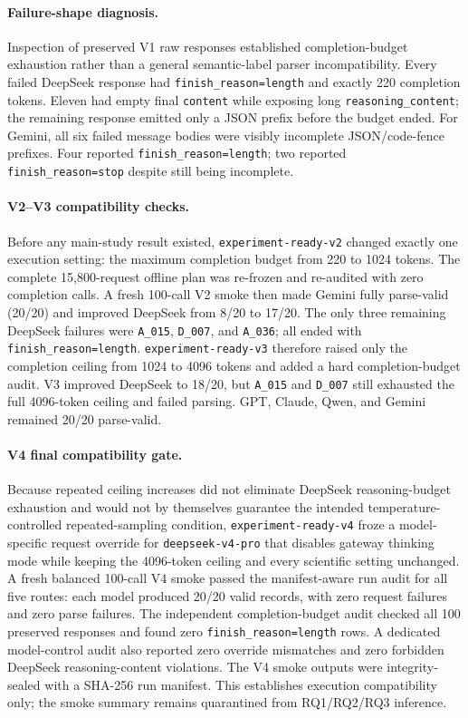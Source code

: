 \paragraph{Failure-shape diagnosis.}
Inspection of preserved V1 raw responses established completion-budget exhaustion rather than a general semantic-label parser incompatibility. Every failed DeepSeek response had \texttt{finish\_reason=length} and exactly 220 completion tokens. Eleven had empty final \texttt{content} while exposing long \texttt{reasoning\_content}; the remaining response emitted only a JSON prefix before the budget ended. For Gemini, all six failed message bodies were visibly incomplete JSON/code-fence prefixes. Four reported \texttt{finish\_reason=length}; two reported \texttt{finish\_reason=stop} despite still being incomplete.

\paragraph{V2--V3 compatibility checks.}
Before any main-study result existed, \texttt{experiment-ready-v2} changed exactly one execution setting: the maximum completion budget from 220 to 1024 tokens. The complete 15,800-request offline plan was re-frozen and re-audited with zero completion calls. A fresh 100-call V2 smoke then made Gemini fully parse-valid (20/20) and improved DeepSeek from 8/20 to 17/20. The only three remaining DeepSeek failures were \texttt{A\_015}, \texttt{D\_007}, and \texttt{A\_036}; all ended with \texttt{finish\_reason=length}. \texttt{experiment-ready-v3} therefore raised only the completion ceiling from 1024 to 4096 tokens and added a hard completion-budget audit. V3 improved DeepSeek to 18/20, but \texttt{A\_015} and \texttt{D\_007} still exhausted the full 4096-token ceiling and failed parsing. GPT, Claude, Qwen, and Gemini remained 20/20 parse-valid.

\paragraph{V4 final compatibility gate.}
Because repeated ceiling increases did not eliminate DeepSeek reasoning-budget exhaustion and would not by themselves guarantee the intended temperature-controlled repeated-sampling condition, \texttt{experiment-ready-v4} froze a model-specific request override for \texttt{deepseek-v4-pro} that disables gateway thinking mode while keeping the 4096-token ceiling and every scientific setting unchanged. A fresh balanced 100-call V4 smoke passed the manifest-aware run audit for all five routes: each model produced 20/20 valid records, with zero request failures and zero parse failures. The independent completion-budget audit checked all 100 preserved responses and found zero \texttt{finish\_reason=length} rows. A dedicated model-control audit also reported zero override mismatches and zero forbidden DeepSeek reasoning-content violations. The V4 smoke outputs were integrity-sealed with a SHA-256 run manifest. This establishes execution compatibility only; the smoke summary remains quarantined from RQ1/RQ2/RQ3 inference.

